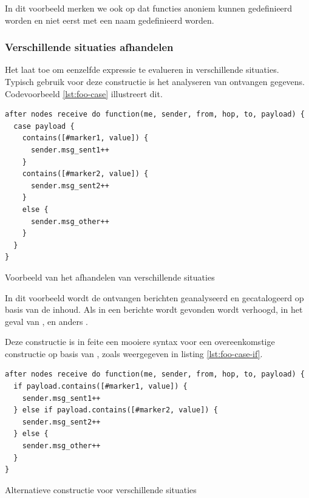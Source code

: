 In dit voorbeeld merken we ook op dat functies anoniem kunnen gedefinieerd
worden en niet eerst met een naam gedefinieerd worden.

\subsubsection{Verschillende situaties afhandelen}

Het  laat toe om eenzelfde expressie te evalueren in
verschillende situaties. Typisch gebruik voor deze constructie is het
analyseren van ontvangen gegevens. Codevoorbeeld \ref{lst:foo-case} illustreert dit.

\begin{listing}[ht]
  \begin{verbatim}
after nodes receive do function(me, sender, from, hop, to, payload) {
  case payload {
    contains([#marker1, value]) {
      sender.msg_sent1++
    }
    contains([#marker2, value]) {
      sender.msg_sent2++
    }
    else {
      sender.msg_other++
    }
  }
}
  \end{verbatim}
  \vspace{-5mm}
  \caption{Voorbeeld van het afhandelen van verschillende situaties}
  \label{lst:foo-case}
\end{listing}

In dit voorbeeld wordt de ontvangen berichten geanalyseerd en gecatalogeerd op
basis van de inhoud. Als in een berichte  wordt gevonden wordt
 verhoogd, in het geval van , 
en anders .

Deze constructie is in feite een mooiere syntax voor een overeenkomstige
constructie op basis van , zoals weergegeven in listing
\ref{lst:foo-case-if}.

\begin{listing}[ht]
  \begin{verbatim}
after nodes receive do function(me, sender, from, hop, to, payload) {
  if payload.contains([#marker1, value]) {
    sender.msg_sent1++
  } else if payload.contains([#marker2, value]) {
    sender.msg_sent2++
  } else {
    sender.msg_other++
  }
}
  \end{verbatim}
  \vspace{-5mm}
  \caption{Alternatieve constructie voor verschillende situaties}
  \label{lst:foo-case-if}
\end{listing}

